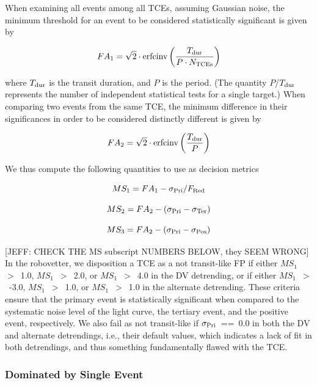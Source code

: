 When examining all events among all TCEs, assuming Gaussian noise, the minimum threshold for an event to be considered statistically significant is given by

\begin{equation}
    FA_{1} = \sqrt{2}\cdot \textrm{erfcinv}\left(\frac{T_{\rm dur}}{P \cdot N_{\rm TCEs}}\right)
\end{equation}

\noindent where $T_{\rm dur}$ is the transit duration, and $P$ is the period. (The quantity $P$/$T_{\rm dur}$ represents the number of independent statistical tests for a single target.) When comparing two events from the same TCE, the minimum difference in their significances in order to be considered distinctly different is given by

\begin{equation}
    FA_{2} = \sqrt{2}\cdot \textrm{erfcinv}\left(\frac{T_{\rm dur}}{P}\right)
\end{equation}

\noindent We thus compute the following quantities to use as decision metrics

\begin{equation}
    MS_{1} = FA_{1} - \sigma_{\rm Pri}/F_{\rm Red}
\end{equation}

\begin{equation}
    MS_{2} = FA_{2} - (\sigma_{\rm Pri} - \sigma_{\rm Ter})
\end{equation}

\begin{equation}
    MS_{3} = FA_{2} - (\sigma_{\rm Pri} - \sigma_{\rm Pos})
\end{equation}

[JEFF: CHECK THE MS subscript NUMBERS BELOW, they SEEM WRONG]
In the robovetter, we disposition a TCE as a not transit-like FP if either $MS_{1}$~$>$~1.0, $MS_{1}$~$>$~2.0, or $MS_{1}$~$>$~4.0 in the DV detrending, or if either $MS_{1}$~$>$~-3.0, $MS_{1}$~$>$~1.0, or $MS_{1}$~$>$~1.0 in the alternate detrending. These criteria ensure that the primary event is statistically significant when compared to the systematic noise level of the light curve, the tertiary event, and the positive event, respectively. We also fail as not transit-like if $\sigma_{\rm Pri}$~==~0.0 in both the DV and alternate detrendings, i.e., their default values, which indicates a lack of fit in both detrendings, and thus something fundamentally flawed with the TCE.


\subsubsection{Dominated by Single Event}
\label{s:sesmes}

